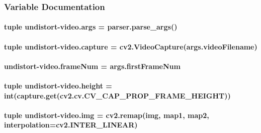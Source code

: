 \subsubsection{Variable Documentation}
\hypertarget{namespaceundistort-video_a20afbfc87021440bd19e2857ee5c0433}{
\paragraph[{args}]{\setlength{\rightskip}{0pt plus 5cm}tuple undistort-\/video.\-args = parser.\-parse\-\_\-args()}}\label{namespaceundistort-video_a20afbfc87021440bd19e2857ee5c0433}
\hypertarget{namespaceundistort-video_a00bef9154ed9c32f455fd219314fe791}{
\paragraph[{capture}]{\setlength{\rightskip}{0pt plus 5cm}tuple undistort-\/video.\-capture = cv2.\-Video\-Capture(args.\-video\-Filename)}}\label{namespaceundistort-video_a00bef9154ed9c32f455fd219314fe791}
\hypertarget{namespaceundistort-video_a80fb79bd13dda4c7d9cd257b402bef02}{
\paragraph[{frame\-Num}]{\setlength{\rightskip}{0pt plus 5cm}undistort-\/video.\-frame\-Num = args.\-first\-Frame\-Num}}\label{namespaceundistort-video_a80fb79bd13dda4c7d9cd257b402bef02}
\hypertarget{namespaceundistort-video_a61478fbe5632ba582850efa0107e6852}{
\paragraph[{height}]{\setlength{\rightskip}{0pt plus 5cm}tuple undistort-\/video.\-height = int(capture.\-get(cv2.\-cv.\-C\-V\-\_\-\-C\-A\-P\-\_\-\-P\-R\-O\-P\-\_\-\-F\-R\-A\-M\-E\-\_\-\-H\-E\-I\-G\-H\-T))}}\label{namespaceundistort-video_a61478fbe5632ba582850efa0107e6852}
\hypertarget{namespaceundistort-video_a22a7a4e91d80b5f2cad6f8b9bd83c481}{
\paragraph[{img}]{\setlength{\rightskip}{0pt plus 5cm}tuple undistort-\/video.\-img = cv2.\-remap(img, map1, map2, interpolation=cv2.\-I\-N\-T\-E\-R\-\_\-\-L\-I\-N\-E\-A\-R)}}\label{namespaceundistort-video_a22a7a4e91d80b5f2cad6f8b9bd83c481}

